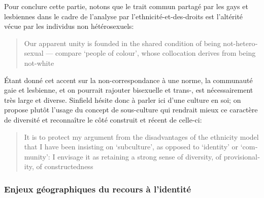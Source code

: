 Pour conclure cette partie, notons que le trait commun partagé par les gays et lesbiennes dans le cadre de l'analyse par l'ethnicité-et-des-droits est l'altérité vécue par les individus non hétérosexuels: \foreignblockquote{english}[{\cite[289]{Sinfield1996}}][.]{Our apparent unity is founded in the shared condition of being not-heterosexual --- compare `people of colour', whose collocation derives from being not-white}. 
Étant donné cet accent sur la non-correspondance à une norme, la communauté gaie et lesbienne, et on pourrait rajouter bisexuelle et trans-, est nécessairement très large et diverse. 
Sinfield hésite donc à parler ici d'une culture en soi; on propose plutôt l'usage du concept de sous-culture qui rendrait mieux ce caractère de diversité et reconnaître le côté construit et récent de celle-ci:
\foreignblockquote{english}[{\cite[289]{Sinfield1996}}][.]{It is to protect my argument from the disadvantages of the ethnicity model that I have been insisting on `subculture', as opposed to `identity' or `community': I envisage it as retaining a strong sense of diversity, of provisionality, of constructedness}.



\subsubsection{Enjeux géographiques du recours à l'identité}
\label{sec:enjeux_g_ographiques_du_recours_l_identit_} 

